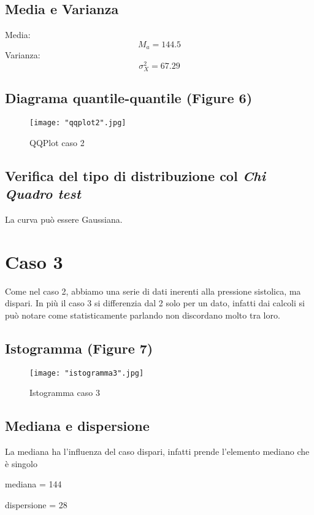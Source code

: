 \documentclass[a4paper]{article}
\begin{document}
\subsection{Media e Varianza}
Media: 
\begin{equation}
	M_{a} = 144.5
\end{equation}
Varianza: 
\begin{equation}
	\sigma _{X}^{2} = 67.29
\end{equation}

\subsection{Diagrama quantile-quantile (Figure 6)}
\begin{figure}[htp]
	\centering
	\texttt{[image: "qqplot2".jpg]}
	\caption{QQPlot caso 2}
	\label{}
\end{figure}

\subsection{Verifica del tipo di distribuzione col \emph{Chi Quadro test}}
La curva può essere Gaussiana.


\section{Caso 3}

Come nel caso 2, abbiamo una serie di dati inerenti alla pressione sistolica, ma dispari.
In più il caso 3 si differenzia dal 2 solo per un dato, infatti dai calcoli si può notare come statisticamente parlando non discordano molto tra loro.
\\

\subsection{Istogramma (Figure 7)}
\begin{figure}[htp]
	\centering
	\texttt{[image: "istogramma3".jpg]}
	\caption{Istogramma caso 3}
	\label{}
\end{figure}

\subsection{Mediana e dispersione}
La mediana ha l'influenza del caso dispari, infatti prende l'elemento mediano che è singolo 
\begin{center}
	mediana = 144
\end{center}
\begin{center}
	dispersione = 28
\end{center}
\end{document}
